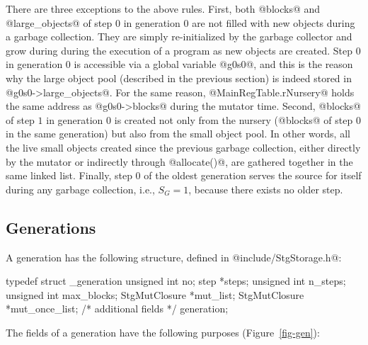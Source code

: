 \documentclass{article}
\begin{document}
There are three exceptions to the above rules. 
First, both @blocks@ and @large_objects@ of
step $0$ in generation $0$ are not filled with new objects during a garbage 
collection. 
They are simply re-initialized by the garbage collector and 
grow during during the execution of a program as new objects are
created.
Step $0$ in generation $0$ is accessible via a global variable @g0s0@, 
and this is the reason why the large object pool (described in the previous 
section) is indeed stored in @g0s0->large_objects@. 
For the same reason, @MainRegTable.rNursery@ holds the same address as 
@g0s0->blocks@ during the mutator time.
Second, @blocks@ of step $1$ in generation $0$ is created not only from
the nursery (@blocks@ of step $0$ in the same generation) but also from the 
small object pool. In other words, all the live small objects created since
the previous garbage collection, either directly by the mutator or indirectly
through @allocate()@, are gathered together in the same linked list.
Finally, step $0$ of the oldest generation serves the source for itself during
any garbage collection, i.e., $S_G = 1$, because there exists no older step.

\subsection{Generations}

A generation has the following structure, defined in 
@include/StgStorage.h@:

\begin{code}
typedef struct _generation {
  unsigned int no;
  step *steps;
  unsigned int n_steps;
  unsigned int max_blocks;
  StgMutClosure *mut_list;
  StgMutClosure *mut_once_list;
  /* additional fields */
} generation;
\end{code}

The fields of a generation have the following purposes (Figure~\ref{fig-gen}):
\end{document}
